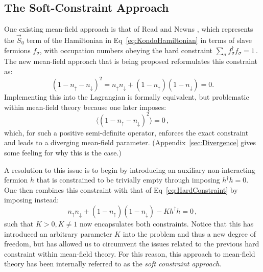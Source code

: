 \subsection{The Soft-Constraint Approach}


One existing mean-field approach is that of Read and Newns \cite{ReadNewns}, which represents the $ \vec{S}_0 $ term of the Hamiltonian in Eq~\eqref{eq:KondoHamiltonian} in terms of slave fermions $ f^{}_{\sigma} $, with occupation numbers obeying the hard constraint $ \sum_{\sigma} f^{\dagger}_{\sigma} f^{}_{\sigma} = 1 \,. $ The new mean-field approach that is being proposed reformulates this constraint as: \begin{equation} (1 - n_{\uparrow} - n_{\downarrow})^2 = n_{\uparrow} n_{\downarrow} + (1 - n_{\uparrow})(1 - n_{\downarrow}) = 0 . \label{eq:HardConstraint}\end{equation} Implementing this into the Lagrangian is formally equivalent, but problematic within mean-field theory because one later imposes: \[ \langle (1 - n_{\uparrow} - n_{\downarrow})^2 \rangle = 0\,, \] which, for such a positive semi-definite operator, enforces the exact constraint and leads to a diverging mean-field parameter. (Appendix~\ref{sec:Divergence} gives some feeling for why this is the case.)

A resolution to this issue is to begin by introducing an auxiliary non-interacting fermion $ h $ that is constrained to be trivially empty through imposing $ h^{\dagger} h = 0 $. One then combines this constraint with that of Eq~\eqref{eq:HardConstraint} by imposing instead: \begin{equation} n_{\uparrow} n_{\downarrow} + (1 - n_{\uparrow})(1 - n_{\downarrow}) - K h^{\dagger} h = 0\,, \end{equation} such that $ K > 0, K \neq 1 $ now encapsulates both constraints. Notice that this has introduced an arbitrary parameter $ K $ into the problem and thus a new degree of freedom, but has allowed us to circumvent the issues related to the previous hard constraint within mean-field theory. For this reason, this approach to mean-field theory has been internally referred to as the \emph{soft constraint approach}.

